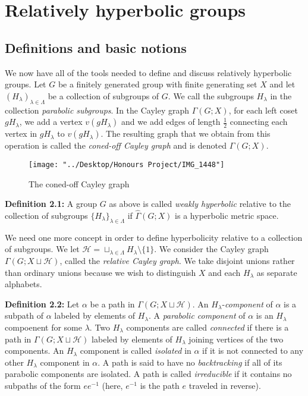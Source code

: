 \documentclass[12pt]{article}
\newcommand{\vs}{\vskip10pt}
\begin{document}
	\newpage
	\section{Relatively hyperbolic groups}
	\subsection{Definitions and basic notions}
	
	We now have all of the tools needed to define and discuss relatively hyperbolic groups. Let $G$ be a finitely generated group with finite generating set $X$ and let $(H_{\lambda})_{\lambda \in \Lambda}$ be a collection of subgroups of $G$. We call the subgroups $H_{\lambda}$ in the collection \textit{parabolic subgroups}. In the Cayley graph $\Gamma(G;X)$, for each left coset $gH_{\lambda}$, we add a vertex $v(gH_{\lambda})$ and we add edges of length $\frac{1}{2}$ connecting each vertex in $gH_{\lambda}$ to $v(gH_{\lambda})$. The resulting graph that we obtain from this operation is called the \textit{coned-off Cayley graph} and is denoted $\hat{\Gamma}(G;X)$.
	
	
	\vs 
\begin{figure} [H]
	\centering
	\texttt{[image: "../Desktop/Honours Project/IMG\_1448"]}
	\caption{The coned-off Cayley graph}
	\label{fig:img1448}
\end{figure}
	
	\textbf{Definition 2.1: } A group $G$ as above is called \textit{weakly hyperbolic} relative to the collection of subgroups $\{H_{\lambda}\}_{\lambda \in \Lambda}$ if $\hat{\Gamma}(G;X)$ is a hyperbolic metric space. 
	
	\vs 
	
	We need one more concept in order to define hyperbolicity relative to a collection of subgroups. We let $\mathcal{H} = \sqcup_{\lambda \in \Lambda} H_{\lambda} \setminus \{1\}$. We consider the Cayley graph $\Gamma(G; X \sqcup \mathcal{H})$, called the \textit{relative Cayley graph}. We take disjoint unions rather than ordinary unions because we wish to distinguish $X$ and each $H_{\lambda}$ as separate alphabets.
	
	\vs 
	
	\textbf{Definition 2.2: } Let $\alpha$ be a path in $\Gamma(G; X \sqcup \mathcal{H})$. An $H_{\lambda}$-\textit{component} of $\alpha$ is a subpath of $\alpha$ labeled by elements of $H_{\lambda}$. A \textit{parabolic component} of $\alpha$ is an $H_{\lambda}$ compoenent for some $\lambda$. Two $H_{\lambda}$ components are called \textit{connected} if there is a path in $\Gamma(G; X \sqcup \mathcal{H})$ labeled by elements of $H_{\lambda}$ joining vertices of the two components. An $H_{\lambda}$ component is called \textit{isolated} in $\alpha$ if it is not connected to any other $H_{\lambda}$ component in $\alpha$. A path is said to have no \textit{backtracking} if all of its parabolic components are isolated. A path is called \textit{irreducible} if it contains no subpaths of the form $ee^{-1}$ (here, $e^{-1}$ is the path $e$ traveled in reverse).
	
\end{document}
